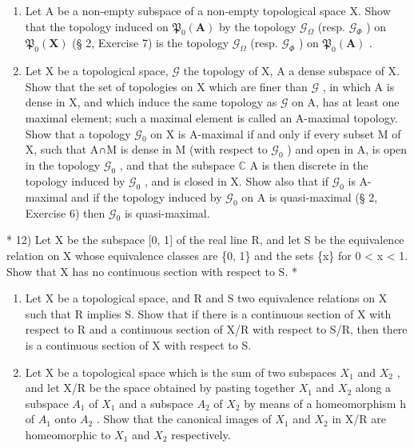 \begin{enumerate}
\def\labelenumi{\arabic{enumi})}
\setcounter{enumi}{9}
\item
  Let A be a non-empty subspace of a non-empty topological space X. Show that the topology induced on \(\mathfrak{P}_{0}(\mathbf{A})\) by the topology \(\mathcal{G}_{\Omega}\) (resp. \(\mathcal{G}_{\Phi}\) ) on \(\mathfrak{P}_{0}(\mathbf{X})\) (§ 2, Exercise 7) is the topology \(\mathcal{G}_{\Omega}\) (resp. \(\mathcal{G}_{\Phi}\) ) on \(\mathfrak{P}_{0}(\mathbf{A})\) .
\item
  Let X be a topological space, \(\mathcal{G}\) the topology of X, A a dense subspace of X. Show that the set of topologies on X which are finer than \(\mathcal{G}\) , in which A is dense in X, and which induce the same topology as \(\mathcal{G}\) on A, has at least one maximal element; such a maximal element is called an A-maximal topology. Show that a topology \(\mathcal{G}_0\) on X is A-maximal if and only if every subset M of X, such that A∩M is dense in M (with respect to \(\mathcal{G}_0\) ) and open in A, is open in the topology \(\mathcal{G}_0\) , and that the subspace \(\mathbb{C}\) A is then discrete in the topology induced by \(\mathcal{G}_0\) , and is closed in X. Show also that if \(\mathcal{G}_0\) is A-maximal and if the topology induced by \(\mathcal{G}_0\) on A is quasi-maximal (§ 2, Exercise 6) then \(\mathcal{G}_0\) is quasi-maximal.
\end{enumerate}

* 12) Let X be the subspace {[}0, 1{]} of the real line R, and let S be the equivalence relation on X whose equivalence classes are \{0, 1\} and the sets \{x\} for 0 \textless{} x \textless{} 1. Show that X has no continuous section with respect to S. *

\begin{enumerate}
\def\labelenumi{\arabic{enumi})}
\setcounter{enumi}{12}
\item
  Let X be a topological space, and R and S two equivalence relations on X such that R implies S. Show that if there is a continuous section of X with respect to R and a continuous section of X/R with respect to S/R, then there is a continuous section of X with respect to S.
\item
  Let X be a topological space which is the sum of two subspaces \(X_{1}\) and \(X_{2}\) , and let X/R be the space obtained by pasting together \(X_{1}\) and \(X_{2}\) along a subspace \(A_{1}\) of \(X_{1}\) and a subspace \(A_{2}\) of \(X_{2}\) by means of a homeomorphism h of \(A_{1}\) onto \(A_{2}\) . Show that the canonical images of \(X_{1}\) and \(X_{2}\) in X/R are homeomorphic to \(X_{1}\) and \(X_{2}\) respectively.
\end{enumerate}

